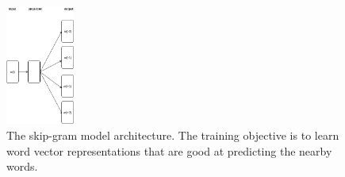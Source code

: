 \begin{figure}[t!]
	
	\includegraphics[width=0.20\textwidth]{skipgram}
	\caption{The skip-gram model architecture. The training objective is to learn word vector representations that are good at predicting the nearby words.}
	\label{fig:clf}
\end{figure}

